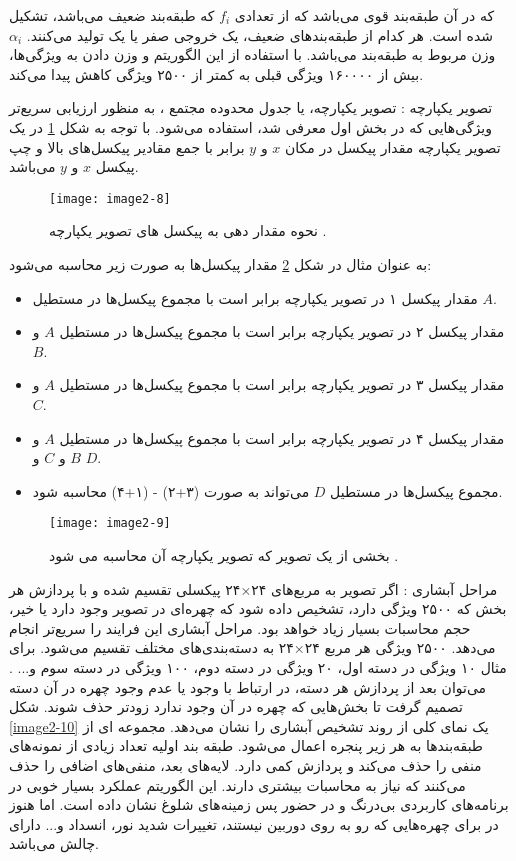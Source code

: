 \noindent
که در آن  طبقه‌بند قوی می‌باشد که از تعدادی $f_i$ که طبقه‌بند ضعیف می‌باشد، تشکیل شده است. هر کدام از طبقه‌بندهای ضعیف، یک خروجی صفر یا یک تولید می‌کنند. $\alpha_i$ وزن مربوط به طبقه‌بند می‌باشد. با استفاده از این الگوریتم و وزن دادن به ویژگی‌ها، بیش از ۱۶۰۰۰۰ ویژگی قبلی به کمتر از ۲۵۰۰ ویژگی کاهش پیدا می‌کند.

\noindent
تصویر یکپارچه : تصویر یکپارچه، یا جدول محدوده مجتمع ، به منظور ارزيابی سريع‌تر ویژگی‌هایی که در بخش اول معرفی شد، استفاده می‌شود. با توجه به شکل \ref{image2-8} در یک تصویر یکپارچه مقدار پیکسل در مکان $x$ و $y$ برابر با جمع مقادیر پیکسل‌های بالا و چپ پیکسل $x$ و $y$ می‌باشد.

\begin{figure}[h]
\centering
  \texttt{[image: image2-8]}
  \caption{نحوه مقدار دهی به پیکسل های تصویر یکپارچه \cite{990517}.}
  \label{image2-8}
\end{figure}

\noindent
به عنوان مثال در شکل \ref{image2-9} مقدار پیکسل‌ها به صورت زیر محاسبه می‌شود:
\begin{itemize}
\item
مقدار پیکسل ۱ در تصویر یکپارچه برابر است با مجموع پیکسل‌ها در مستطیل $A$.
\item
مقدار پیکسل ۲ در تصویر یکپارچه برابر است با مجموع پیکسل‌ها در مستطیل $A$ و $B$.
\item
مقدار پیکسل ۳ در تصویر یکپارچه برابر است با مجموع پیکسل‌ها در مستطیل $A$ و $C$.
\item
مقدار پیکسل ۴ در تصویر یکپارچه برابر است با مجموع پیکسل‌ها در مستطیل $A$ و $B$ و $C$ و $D$.
\item
مجموع پیکسل‌ها در مستطیل $D$ می‌تواند به صورت (۳+۲) - (۱+۴) محاسبه شود.
\end{itemize} 

\begin{figure}[h]
\centering
  \texttt{[image: image2-9]}
  \caption{بخشی از یک تصویر که تصویر یکپارچه آن محاسبه می شود \cite{990517}.}
  \label{image2-9}
\end{figure}

\noindent
مراحل آبشاری : اگر تصویر به مربع‌های ۲۴×۲۴ پیکسلی تقسیم شده و با پردازش هر بخش که ۲۵۰۰ ویژگی دارد، تشخیص داده شود که چهره‌ای در تصویر وجود دارد یا خیر، حجم محاسبات بسیار زیاد خواهد بود. مراحل آبشاری این فرایند را سریع‌تر انجام می‌دهد. ۲۵۰۰ ویژگی هر مربع ۲۴×۲۴ به دسته‌بندی‌های مختلف تقسیم می‌شود. برای مثال ۱۰ ویژگی در دسته‌ اول، ۲۰ ویژگی در دسته دوم، ۱۰۰ ویژگی در دسته سوم و... . می‌توان بعد از پردازش هر دسته، در ارتباط با وجود یا عدم وجود چهره در آن دسته تصمیم گرفت تا بخش‌هایی که چهره در آن وجود ندارد زودتر حذف شوند. شکل \ref{image2-10} یک نمای کلی از روند تشخیص آبشاری را نشان می‌دهد. مجموعه ای از طبقه‌بندها به هر زیر پنجره اعمال می‌شود. طبقه بند اولیه تعداد زیادی از نمونه‌های منفی را حذف می‌کند و پردازش کمی دارد. لایه‌های بعد، منفی‌های اضافی را حذف می‌کنند که نیاز به محاسبات بیشتری دارند. این الگوریتم عملکرد بسیار خوبی در برنامه‌های کاربردی بی‌درنگ و در حضور پس زمینه‌های شلوغ نشان داده است. اما هنوز در برای چهره‌هایی که رو به روی دوربین نیستند، تغییرات شدید نور، انسداد و... دارای چالش می‌باشد.

